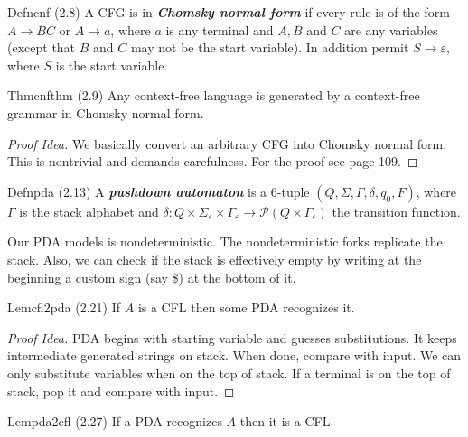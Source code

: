 \begin{reference}{Defn}{cnf}
  (2.8) A CFG is in \textbf{\textit{Chomsky normal form}} if every rule is of the form $A\to BC$ or $A\to a$, where $a$ is any terminal and $A,B$ and $C$ are any variables (except that $B$ and $C$ may not be the start variable). In addition permit $S\to \varepsilon$, where $S$ is the start variable.
\end{reference}

\begin{reference}{Thm}{cnfthm}
  (2.9) Any context-free language is generated by a context-free grammar in Chomsky normal form.
\end{reference}

\begin{proof}[Proof Idea]
  We basically convert an arbitrary CFG into Chomsky normal form. This is nontrivial and demands carefulness. For the proof see page 109.
\end{proof}

\begin{reference}{Defn}{pda}
  (2.13) A \textbf{\textit{pushdown automaton}} is a $6$-tuple $(Q,\Sigma,\Gamma,\delta,q_0,F)$, where $\Gamma$ is the stack alphabet and $\delta:Q\times \Sigma_{\varepsilon}\times \Gamma_{\varepsilon}\rightarrow \mathcal{P}(Q\times \Gamma_{\varepsilon})$ the transition function.
\end{reference}

Our PDA models is nondeterministic. The nondeterministic forks replicate the stack. Also, we can check if the stack is effectively empty by writing at the beginning a custom sign (say \$) at the bottom of it.

\begin{reference}{Lem}{cfl2pda}
  (2.21) If $A$ is a CFL then some PDA recognizes it.
\end{reference}

\begin{proof}[Proof Idea]
  PDA begins with starting variable and guesses substitutions. It keeps intermediate generated strings on stack. When done, compare with input. We can only substitute variables when on the top of stack. If a terminal is on the top of stack, pop it and compare with input.
\end{proof}

\begin{reference}{Lem}{pda2cfl}
  (2.27) If a PDA recognizes $A$ then it is a CFL.
\end{reference}

